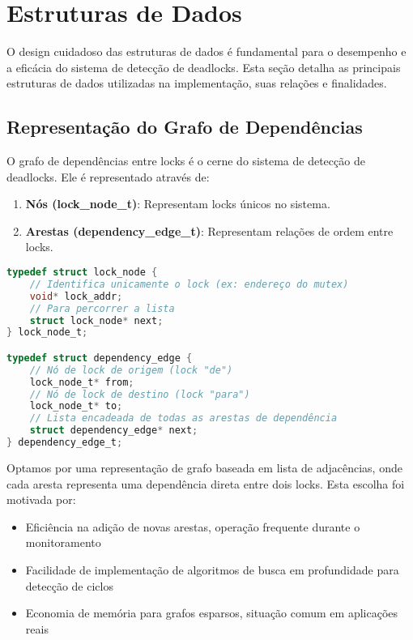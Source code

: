 \section{Estruturas de Dados}\label{sec:estruturas}

O design cuidadoso das estruturas de dados é fundamental para o desempenho e a eficácia do sistema de detecção de deadlocks. Esta seção detalha as principais estruturas de dados utilizadas na implementação, suas relações e finalidades.

\subsection{Representação do Grafo de Dependências}

O grafo de dependências entre locks é o cerne do sistema de detecção de deadlocks. Ele é representado através de:

\begin{enumerate}
    \item \textbf{Nós (lock\_node\_t)}: Representam locks únicos no sistema.
    \item \textbf{Arestas (dependency\_edge\_t)}: Representam relações de ordem entre locks.
\end{enumerate}

\begin{lstlisting}[language=C, caption={Definição das estruturas para representação do grafo}]
typedef struct lock_node {
    // Identifica unicamente o lock (ex: endereço do mutex)
    void* lock_addr;
    // Para percorrer a lista
    struct lock_node* next;
} lock_node_t;

typedef struct dependency_edge {
    // Nó de lock de origem (lock "de")
    lock_node_t* from;
    // Nó de lock de destino (lock "para")
    lock_node_t* to;
    // Lista encadeada de todas as arestas de dependência
    struct dependency_edge* next;
} dependency_edge_t;
\end{lstlisting}

Optamos por uma representação de grafo baseada em lista de adjacências, onde cada aresta representa uma dependência direta entre dois locks. Esta escolha foi motivada por:

\begin{itemize}
    \item Eficiência na adição de novas arestas, operação frequente durante o monitoramento
    \item Facilidade de implementação de algoritmos de busca em profundidade para detecção de ciclos
    \item Economia de memória para grafos esparsos, situação comum em aplicações reais
\end{itemize}

